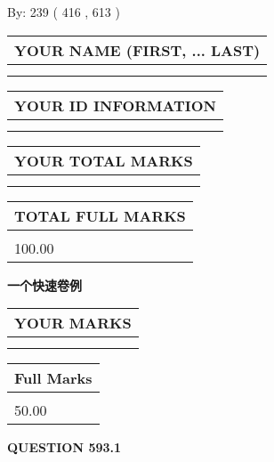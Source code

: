 \documentclass{ctexart}
\begin{document}
   
\hspace{1.0in} By: 
 239 ( 416 ,  613 )
   
   
   
   
\newpage 
\setcounter{page}{ 
   593001 } 
   
   
   
   
\noindent\begin{tabular}{|l|}
\hline
YOUR NAME (FIRST, ... LAST)  \\
\hline
 \\ 
 \\ 
\hline
\end{tabular}
\hspace{0.05in} \begin{tabular}{|l|}
\hline
 YOUR   ID   INFORMATION  \\
\hline
 \\ 
 \\ 
\hline
\end{tabular}
   
   
\vspace{0.2in}\noindent\begin{tabular}{|l|}
\hline
YOUR TOTAL MARKS  \\
\hline
 \\ 
 \\ 
\hline
\end{tabular}
\hspace{0.05in} \begin{tabular}{|l|}
\hline
TOTAL FULL MARKS  \\
\hline
 \\ 
100.00 \\
\hline
\end{tabular}
   
   
 \vspace{0.2in}
{\LARGE {\textbf{ 一个快速卷例}}}
   
   
  
\vspace{0.2in}
  
\noindent\begin{tabular}{|l|}
\hline
 YOUR MARKS  \\
\hline
 \\ 
 \\ 
\hline
\end{tabular}
\hspace{0.05in} \begin{tabular}{|l|}
\hline
 Full Marks  \\
\hline
 \\ 
50.00 \\
\hline
\end{tabular}
{\textbf{\Large{QUESTION
593.1 
}}}
  
\end{document}
